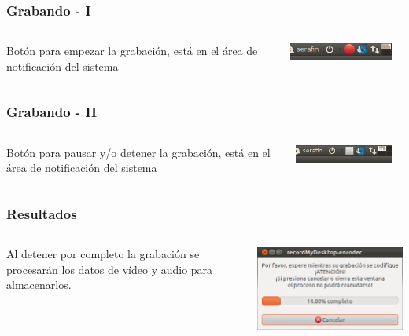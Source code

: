 \documentclass{beamer}
\begin{document}
		\begin{frame}
			\frametitle{Grabando - I}
			\begin{columns}
				\begin{column}[l]{5cm}
					\justifying
					Botón para empezar la grabación, está en el área de notificación del sistema
				\end{column}
				\begin{column}[r]{5cm}
					\includegraphics[width=0.9\textwidth, keepaspectratio=true]{Imagenes/Interfaz/06.png}
				\end{column}
			\end{columns}
		\end{frame}
		\begin{frame}
			\frametitle{Grabando - II}
			\begin{columns}
				\begin{column}[l]{5cm}
					\justifying 
					Botón para pausar y/o detener la grabación, está en el área de notificación del sistema
				\end{column}
				\begin{column}[r]{5cm}
					\includegraphics[width=0.9\textwidth, keepaspectratio=true]{Imagenes/Interfaz/07.png}
				\end{column}
			\end{columns}
		\end{frame}
		\begin{frame}
			\frametitle{Resultados}
			\begin{columns}
				\begin{column}[l]{5cm}
					\justifying 
					Al detener por completo la grabación se procesarán los datos de vídeo y audio para almacenarlos.
				\end{column}
				\begin{column}[r]{5cm}
					\includegraphics[height=0.4\textheight, keepaspectratio=true]{Imagenes/Interfaz/08.png}
				\end{column}
			\end{columns}
		\end{frame}
\end{document}
